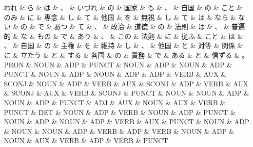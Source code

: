 \documentclass[tikz,border=5pt]{standalone}
\begin{document}
\fontsize{5pt}{6pt}\selectfont
\begin{dependency}[edge unit distance=3.6pt]
    \begin{deptext}[column sep=0.3em]
        われ \& ら \& は \& 、 \& いづれ \& の \& 国家 \& も \& 、 \& 自国 \& の \& こと \& のみ \& に \& 専念 \& し \& て \& 他国 \& を \& 無視 \& し \& て \& は \& なら \& ない \& の \& で \& あつ \& て \& 、 \& 政治 \& 道徳 \& の \& 法則 \& は \& 、 \& 普遍的 \& な \& もの \& で \& あり \& 、 \& この \& 法則 \& に \& 従ふ \& こと \& は \& 、 \& 自国 \& の \& 主権 \& を \& 維持 \& し \& 、 \& 他国 \& と \& 対等 \& 関係 \& に \& 立たう \& と \& する \& 各国 \& の \& 責務 \& で \& ある \& と \& 信ずる \& 。\\
        PRON \& NOUN \& ADP \& PUNCT \& NOUN \& ADP \& NOUN \& ADP \& PUNCT \& NOUN \& ADP \& NOUN \& ADP \& ADP \& VERB \& AUX \& SCONJ \& NOUN \& ADP \& VERB \& AUX \& SCONJ \& ADP \& VERB \& AUX \& SCONJ \& AUX \& VERB \& SCONJ \& PUNCT \& NOUN \& NOUN \& ADP \& NOUN \& ADP \& PUNCT \& ADJ \& AUX \& NOUN \& AUX \& VERB \& PUNCT \& DET \& NOUN \& ADP \& VERB \& NOUN \& ADP \& PUNCT \& NOUN \& ADP \& NOUN \& ADP \& VERB \& AUX \& PUNCT \& NOUN \& ADP \& NOUN \& NOUN \& ADP \& VERB \& ADP \& VERB \& NOUN \& ADP \& NOUN \& AUX \& VERB \& ADP \& VERB \& PUNCT\\
    \end{deptext}

\end{dependency}
\end{document}
